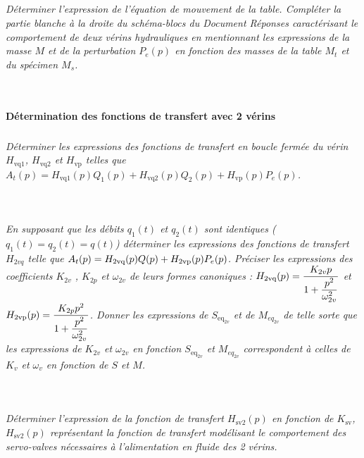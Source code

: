 \documentclass[10pt,fleqn]{article} %
\begin{document}
\subparagraph{\label{q_24}}\textit{Déterminer l’expression de l’équation de mouvement de la table. Compléter la partie blanche à la droite du schéma-blocs du Document Réponses caractérisant le comportement de deux vérins hydrauliques
en mentionnant les expressions de la masse $M$ et de la perturbation $P_e(p)$ en fonction des
masses de la table $M_t$ et du spécimen $M_s$.}
\ifprof
\begin{corrige} ~\\

\end{corrige}
\else
\fi

\paragraph{Détermination des fonctions de transfert avec 2 vérins}

\subparagraph{\label{q_25}}\textit{Déterminer les expressions des fonctions de transfert en boucle fermée du vérin $H_{\text{vq1}}$, $H_{\text{vq2}}$ et $H_{\text{vp}}$ telles que $A_t(p)=H_{\text{vq1}}(p) Q_1(p)+H_{\text{vq2}}(p) Q_2(p)+H_{\text{vp}}(p) P_e(p)$.}
\ifprof
\begin{corrige} ~\\

\end{corrige}
\else
\fi


\subparagraph{\label{q_26}}\textit{En supposant que les débits $q_1(t)$ et $q_2(t)$ sont identiques ($q_1(t)=q_2(t)=q(t)$) déterminer les expressions des fonctions de transfert $H_{2vq}$ telle que $A_t(p)=H_{2\text{vq}}(p) Q(p)+H_{\text{2\text{vp}}}(p) P_e(p)$. Préciser les expressions des coefficients $K_{2v}$ , $K_{2p}$ et $\omega_{2v}$ de leurs formes canoniques : $H_{\text{2\text{vq}}}(p)=\dfrac{K_{2v} p}{1+\dfrac{p^2}{\omega_{2v}^2}}$ et $H_{\text{2\text{vp}}}(p)=\dfrac{K_{2p} p^2}{1+\dfrac{p^2}{\omega_{2v}^2}}$. 
Donner les expressions de $S_{\text{eq}_{2v}}$ et de $M_{eq_{2v}}$ de telle sorte que les expressions de $K_{2v}$ et 
$\omega_{2v}$ en fonction $S_{\text{eq}_{2v}}$ et $M_{eq_{2v}}$ 
correspondent à celles de $K_v$ et $\omega_v$ en fonction de $S$ et $M$.} 
\ifprof
\begin{corrige} ~\\

\end{corrige}
\else
\fi



\subparagraph{\label{q_27}}\textit{Déterminer l’expression de la fonction de transfert $H_{\text{sv}2}(p)$ en fonction de $K_{\text{sv}}$, $H_{\text{sv}2}(p)$ représentant la fonction de transfert modélisant le comportement des servo-valves nécessaires à l’alimentation en fluide des 2 vérins.}
\ifprof
\begin{corrige} ~\\

\end{corrige}
\else
\fi
\end{document}
